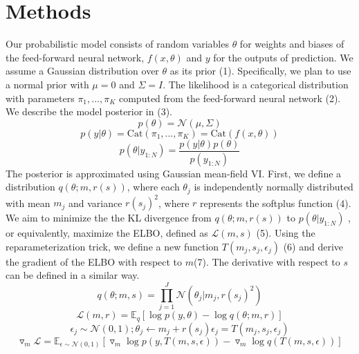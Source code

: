 \documentclass{article}
\begin{document}
\section{Methods}
Our probabilistic model consists of random variables $\theta$ for weights and biases of the feed-forward neural network, $f(x, \theta)$ and $y$ for the outputs of prediction. We assume a Gaussian distribution over $\theta$ as its prior (1). Specifically, we plan to use a normal prior with $\mu = 0$ and $\Sigma = I$. The likelihood is a categorical distribution with parameters $\pi_1,. . .  , \pi_K$ computed from the feed-forward neural network (2). We describe the model posterior in (3).
\begin{equation}
    p(\theta) = \mathcal{N}(\mu, \Sigma)
\end{equation}
\begin{equation}
    p(y|\theta) = \text{Cat}(\pi_1,...,\pi_K) = \text{Cat}(f(x, \theta))
\end{equation}
\begin{equation}
    p(\theta|y_{1:N}) = \frac{p(y|\theta)p(\theta)}{ p(y_{1:N})} 
\end{equation}
The posterior is approximated using Gaussian mean-field VI. First, we define a distribution $q(\theta; m, r(s))$, where each $\theta_j$ is independently normally distributed with mean $m_j$  and variance $r(s_j)^2$, where $r$ represents the softplus function (4). We aim to minimize the the KL divergence from $q(\theta; m, r(s))$ to $p(\theta| y_{1:N})$ , or equivalently, maximize the ELBO, defined as $\mathcal{L} (m, s)$ (5). Using the reparameterization trick, we define a new function $T(m_j, s_j, \epsilon_j)$ (6) and derive the gradient of the ELBO with respect to $m$(7). The derivative with respect to $s$ can be defined in a similar way.
\begin{equation}
    q(\theta; m,s) = \prod_{j=1}^J \mathcal{N}(\theta_j| m_j, r(s_j)^2)
\end{equation}
\begin{equation}
    \mathcal{L}(m,r) = \mathbb{E}_q[\log{p(y, \theta)} - \log{q(\theta; m, r)}]
\end{equation}
\begin{equation}
    \epsilon_j \sim\mathcal{N}(0,1);  \theta_j \leftarrow m_j+r(s_j)\epsilon_j= T (m_j, s_j, \epsilon_j)
\end{equation}
\begin{equation}
    \triangledown_m \mathcal{L} = \mathbb{E}_{\epsilon \sim\mathcal{N}(0, 1)}[\triangledown_m \log{p(y, T(m, s, \epsilon))} - \triangledown_m \log{q(T(m,s,\epsilon))}]
\end{equation}
\end{document}
